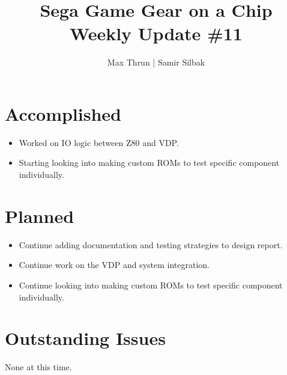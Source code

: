 \documentclass[12pt]{article}
\title{Sega Game Gear on a Chip \\ Weekly Update \#11}
\author{ Max Thrun | Samir Silbak }
\begin{document}
\maketitle

\section*{Accomplished}
\begin{itemize}
    \item Worked on IO logic between Z80 and VDP.
    \item Starting looking into making custom ROMs to test specific component individually.
\end{itemize}

\section*{Planned}
\begin{itemize}
    \item Continue adding documentation and testing strategies to design report.
    \item Continue work on the VDP and system integration.
    \item Continue looking into making custom ROMs to test specific component individually.
\end{itemize}

\section*{Outstanding Issues}
None at this time.

\vspace{.1in}
\end{document}
